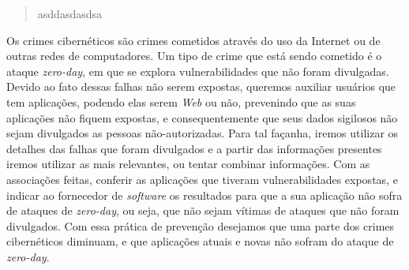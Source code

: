 \begin{abstract}
\nohyphens{
asddasdasdsa
}
\end{abstract}


\begin{resumo}
Os crimes cibernéticos são crimes cometidos através do uso da Internet ou de outras redes de computadores. Um tipo de crime que está 
sendo cometido é o ataque \textit{zero-day}, em que se explora vulnerabilidades que não foram divulgadas. Devido ao fato dessas falhas 
não serem expostas, queremos auxiliar usuários que tem aplicações, podendo elas serem \textit{Web} ou não, prevenindo que as suas 
aplicações não fiquem expostas, e consequentemente que seus dados sigilosos não sejam divulgados as pessoas não-autorizadas. Para tal 
façanha, iremos utilizar os detalhes das falhas que foram divulgados e a partir das informações presentes iremos utilizar as mais 
relevantes, ou tentar combinar informações. Com as associações feitas, conferir as aplicações que tiveram vulnerabilidades 
expostas, e indicar ao fornecedor de \textit{software} os resultados para que a sua aplicação não sofra de ataques de \textit{zero-day}, 
ou seja, que não sejam vítimas de ataques que não foram divulgados. Com essa prática de prevenção desejamos que uma parte dos crimes cibernéticos diminuam, e que aplicações atuais e novas não sofram do ataque de \textit{zero-day}.
\end{resumo}
